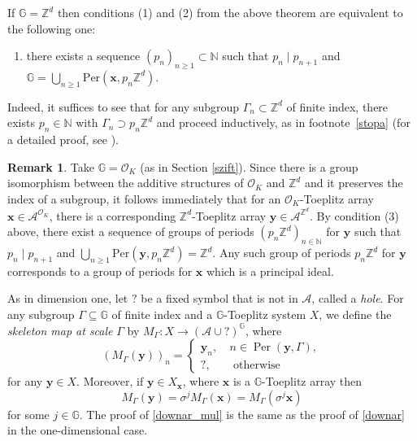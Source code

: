 \documentclass[leqno,a4paper,12pt]{article}
\theoremstyle{definition}
\newtheorem{Remark}[Th]{Remark}
\newcommand{\divides}{\mid}
\newcommand{\Per}{\operatorname{Per}\nolimits}
\newcommand{\Z}{{\mathbb{Z}}}
\newcommand{\N}{{\mathbb{N}}}
\newcommand{\OK}{\mathcal{O}_K}
\newcommand{\G}{\mathbb{G}}
\newcommand{\cA}{\mathcal{A}}
\begin{document}
If $\G=\Z^d$ then conditions (1) and (2) from the above theorem are equivalent to the following one:
\begin{enumerate}
\item[(3)]
there exists a sequence $(p_n)_{n\geq 1}\subset \N$ such that $p_n\divides p_{n+1}$ and $\G=\bigcup_{n\geq1}\text{Per}(\bm{x},p_n\Z^d)$.
\end{enumerate}
Indeed, it suffices to see that for any subgroup $\Gamma_n\subset \Z^d$ of finite index, there exists $p_n\in\N$ with $\Gamma_n\supset p_n\Z^d$ and proceed inductively, as in footnote~\ref{stopa} (for a detailed proof, see {\cite[Proposition 14]{MR2220753}}).
\begin{Remark}
Take $\G=\OK$ (as in Section \ref{szift}). Since there is a group isomorphism between the additive structures of $\OK$ and $\Z^d$ and it preserves the index of a subgroup, it follows immediately that for an $\OK$-Toeplitz array $\bm{x}\in\mathcal{A}^{\OK}$, there is a corresponding $\Z^{d}$-Toeplitz array $\bm{y}\in\mathcal{A}^{\Z^{d}}$. By condition (3) above, there exist a sequence of groups of periods $(p_n\Z^{d})_{n\in\N}$ for $\bm{y}$ such that $p_n\divides p_{n+1}$ and $\bigcup_{n\geq1}\text{Per}(\bm{y},p_n\Z^{d})=\Z^{d}$. Any such group of periods $p_n\Z^{d}$ for $\bm{y}$ corresponds to a group of periods for $\bm{x}$ which is a principal ideal.
\end{Remark}


As in dimension one, let $?$ be a fixed symbol that is not in $\cA$, called a \emph{hole}. For any subgroup $\Gamma\subseteq \G$ of finite index and a $\G$-Toeplitz system $X$, we define the \emph{skeleton map at scale} $\Gamma$ by $M_\Gamma\colon X\rightarrow (\cA\cup ?)^{\G}$, where
\[
\left(M_{\Gamma}(\bm{y})\right)_n=
\begin{cases}
\bm{y}_n,\ &n \in \operatorname{Per}(\bm{y},{\Gamma}),\\
?,\ & \text{ otherwise}
\end{cases}
\]
for any $\bm{y}\in X$. Moreover, if $\bm{y}\in X_{\bm{x}}$, where $\bm{x}$ is a $\G$-Toeplitz array then
\begin{equation}\label{downar_mul}
M_{\Gamma}(\bm{y})=\sigma^{j} M_{\Gamma}(\bm{x})=M_{\Gamma}(\sigma^{j}\bm{x})
\end{equation}
for some $j\in \G$. The proof of \eqref{downar_mul} is the same as the proof of \eqref{downar} in the one-dimensional case.
\end{document}
